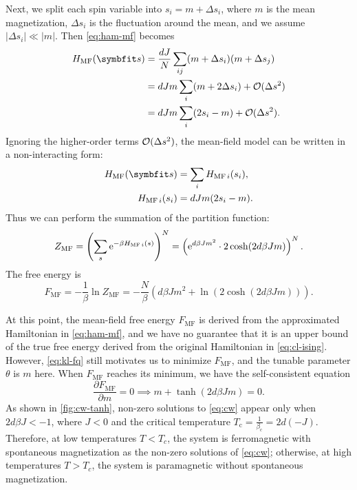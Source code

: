 Next, we split each spin variable into $s_i = m + \Delta s_i$, where $m$ is the mean magnetization, $\Delta s_i$ is the fluctuation around the mean, and we assume $|\Delta s_i| \ll |m|$. Then \cref{eq:ham-mf} becomes
\begin{align}
H_\text{MF}(\vs) &= \frac{d J}{N} \sum_{i j} (m + \Delta s_i) (m + \Delta s_j) \\
&= d J m \sum_i (m + 2 \Delta s_i) + \calO(\Delta s^2) \\
&= d J m \sum_i (2 s_i - m) + \calO(\Delta s^2).
\end{align}
Ignoring the higher-order terms $\mathcal{O}(\Delta s^2)$, the mean-field model can be written in a non-interacting form:
\begin{align}
H_\text{MF}(\vs) &= \sum_i H_{\text{MF}\,i}(s_i), \\
H_{\text{MF}\,i}(s_i) &= d J m (2 s_i - m).
\label{eq:ham-mf-noninter}
\end{align}
Thus we can perform the summation of the partition function:
\begin{equation}
Z_\text{MF}
= \left( \sum_s \mathrm{e}^{-\beta H_{\text{MF}\,i}(s)} \right)^N
= \left( \mathrm{e}^{d \beta J m^2} \cdot 2 \cosh (2 d \beta J m) \right)^N.
\end{equation}
The free energy is
\begin{equation}
F_\text{MF} = -\frac{1}{\beta} \ln Z_\text{MF} = - \frac{N}{\beta} \left(d \beta J m^2 + \ln \left( 2 \cosh (2 d \beta J m) \right) \right).
\label{eq:fe-mf}
\end{equation}

At this point, the mean-field free energy $F_\text{MF}$ is derived from the approximated Hamiltonian in \cref{eq:ham-mf}, and we have no guarantee that it is an upper bound of the true free energy derived from the original Hamiltonian in \cref{eq:cl-ising}. However, \cref{eq:kl-fq} still motivates us to minimize $F_\text{MF}$, and the tunable parameter $\theta$ is $m$ here. When $F_\text{MF}$ reaches its minimum, we have the self-consistent equation
\begin{equation}
\frac{\partial F_\text{MF}}{\partial m} = 0 \implies
m + \tanh(2 d \beta J m) = 0.
\label{eq:cw}
\end{equation}
As shown in \cref{fig:cw-tanh}, non-zero solutions to \cref{eq:cw} appear only when $2 d \beta J < -1$, where $J < 0$ and the critical temperature $T_\text{c} = \frac{1}{\beta_\text{c}} = 2 d (-J)$. Therefore, at low temperatures $T < T_c$, the system is ferromagnetic with spontaneous magnetization as the non-zero solutions of \cref{eq:cw}; otherwise, at high temperatures $T > T_c$, the system is paramagnetic without spontaneous magnetization.


